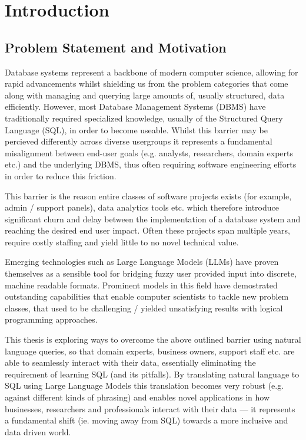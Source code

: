 \documentclass{article}
\begin{document}
\newpage


\section{Introduction}
\subsection{Problem Statement and Motivation}

Database systems represent a backbone of modern computer science, allowing for rapid advancements
whilst shielding us from the problem categories that come along with managing and querying large amounts
of, usually structured, data efficiently. However, most Database Management Systems (DBMS) have
traditionally required specialized knowledge, usually of the Structured Query Language (SQL), in order
to become useable. Whilst this barrier may be percieved differently across diverse usergroups it
represents a fundamental misalignment between end-user goals (e.g. analysts, researchers, domain experts
etc.) and the underlying DBMS, thus often requiring software engineering efforts in order to reduce this friction.

This barrier is the reason entire classes of software projects exists (for example, admin / support panels),
data analytics tools etc. which therefore introduce significant churn and delay between the implementation
of a database system and reaching the desired end user impact. Often these projects span multiple years, require
costly staffing and yield little to no novel technical value.

Emerging technologies such as Large Language Models (LLMs) have proven themselves as a sensible tool for bridging
fuzzy user provided input into discrete, machine readable formats. Prominent models in this field have demostrated
outstanding capabilities that enable computer scientists to tackle new problem classes, that used to be
challenging / yielded unsatisfying results with logical programming approaches.

This thesis is exploring ways to overcome the above outlined barrier using natural language queries, so that domain experts,
business owners, support staff etc. are able to seamlessly interact with their data, essentially eliminating the
requirement of learning SQL (and its pitfalls). By translating natural language to SQL using Large Language Models
this translation becomes very robust (e.g. against different kinds of phrasing) and enables novel applications
in how businesses, researchers and professionals interact with their data — it represents a fundamental shift 
(ie. moving away from SQL) towards a more inclusive and data driven world. 
\end{document}
